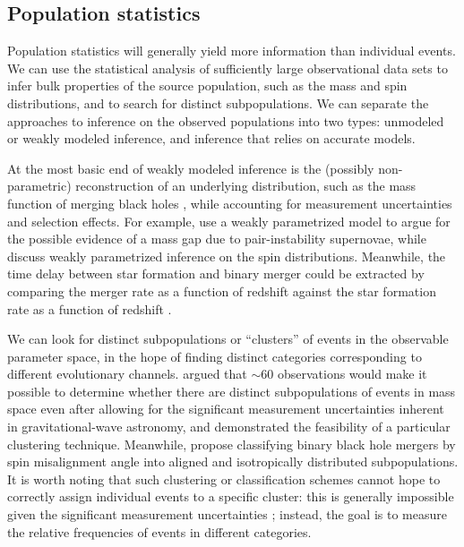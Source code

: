\documentclass[iop,onecolumn]{revtex4-1}
\begin{document}
\subsection{Population statistics}

Population statistics will generally yield more information than individual events.  We can use the statistical analysis of sufficiently large observational data sets to infer bulk properties of the source population, such as the mass and spin distributions, and to search for distinct subpopulations.  We can separate the approaches to inference on the observed populations into two types: unmodeled or weakly modeled inference, and inference that relies on accurate models. 

At the most basic end of weakly modeled inference is the (possibly non-parametric) reconstruction of an underlying distribution, such as the mass function of merging black holes \citep{Mandel:2010stat,BBH:O1}, while accounting for measurement uncertainties and selection effects.  For example, \citet{Fishbach:2017mass} use a weakly parametrized model to argue for the possible evidence of a mass gap due to pair-instability supernovae, while \citet{TalbotThrane:2017} discuss weakly parametrized inference on the spin distributions.  Meanwhile, the time delay between star formation and binary merger could be extracted by comparing the merger rate as a function of redshift against the star formation rate as a function of redshift \citep{Mandel:2016select}.  

We can look for distinct subpopulations or ``clusters'' of events in the observable parameter space, in the hope of finding distinct categories corresponding to different evolutionary channels.  \citet{Mandel:2015} argued that $\sim 60$ observations would make it possible to determine whether there are distinct subpopulations of events in mass space even after allowing for the significant measurement uncertainties inherent in gravitational-wave astronomy, and \citet{Mandel:2016cluster} demonstrated the feasibility of a particular clustering technique.  Meanwhile, \citet{Farr:2018} propose classifying binary black hole mergers by spin misalignment angle into aligned and isotropically distributed subpopulations.  It is worth noting that such clustering or classification schemes cannot hope to correctly assign individual events to a specific cluster: this is generally impossible given the significant measurement uncertainties \citep{Littenberg:2015}; instead, the goal is to measure the relative frequencies of events in different categories.
\end{document}
